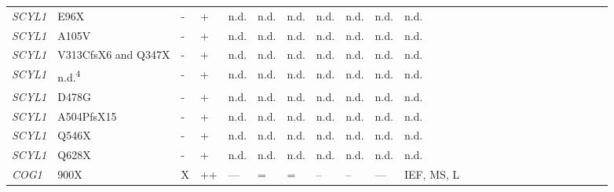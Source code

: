 \begin{landscape}
\begin{longtable}[c]{C{1.2cm}C{2cm}C{0.5cm}C{1.5cm}C{1.5cm}C{0.5cm}C{0.5cm}C{0.5cm}C{0.5cm}C{1.5cm}C{1.5cm}C{1.5cm}c c c c c c c c c c c c}
        \emph{SCYL1} & E96X & -                       & +                                      & n.d.                                 & n.d.   & n.d. & n.d.   & n.d.  & n.d.                                  & n.d.                       & \cite{lenz_scyl1_2018} \\
        \emph{SCYL1} & A105V & -                       & +                                      & n.d.                                 & n.d.   & n.d. & n.d.   & n.d.  & n.d.                                  & n.d.                       & \cite{lenz_scyl1_2018} \\
        \emph{SCYL1} & V313CfsX6 and Q347X & -                       & +                                      & n.d.                                 & n.d.   & n.d. & n.d.   & n.d.  & n.d.                                  & n.d.                       & \cite{lenz_scyl1_2018} \\
        \emph{SCYL1} & n.d.\textsuperscript{4} & -                       & +                                      & n.d.                                 & n.d.   & n.d. & n.d.   & n.d.  & n.d.                                  & n.d.                       & \cite{lenz_scyl1_2018} \\
        \emph{SCYL1} & D478G & -                       & +                                      & n.d.                                 & n.d.   & n.d. & n.d.   & n.d.  & n.d.                                  & n.d.                       & \cite{lenz_scyl1_2018} \\
        \emph{SCYL1} & A504PfsX15 & -                       & +                                      & n.d.                                 & n.d.   & n.d. & n.d.   & n.d.  & n.d.                                  & n.d.                       & \cite{lenz_scyl1_2018} \\
        \emph{SCYL1} & Q546X & -                       & +                                      & n.d.                                 & n.d.   & n.d. & n.d.   & n.d.  & n.d.                                  & n.d.                       & \cite{lenz_scyl1_2018} \\
        \emph{SCYL1} & Q628X & -                       & +                                      & n.d.                                 & n.d.   & n.d. & n.d.   & n.d.  & n.d.                                  & n.d.                       & \cite{lenz_scyl1_2018} \\
        \emph{COG1} & 900X & X                       & ++                                      & ---                                 & =   & = & --   & --  & ---                                  & IEF, MS, L                       & \cite{foulquier_conserved_2006} \\

\end{longtable}
\end{landscape}
